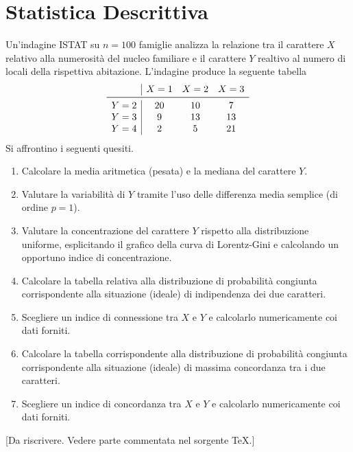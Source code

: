 
\section{Statistica Descrittiva}

\begin{esercizio}
  Un'indagine ISTAT su $n = 100$ famiglie analizza la relazione tra il
  carattere $X$ relativo alla numerosità del nucleo familiare e il
  carattere $Y$ realtivo al numero di locali della rispettiva
  abitazione. L'indagine produce la seguente tabella
  \[
    \begin{array}{c|ccc}
      & X = 1 & X = 2 & X = 3 \\
      \midrule
      Y = 2 & 20    & 10    & 7     \\
      Y = 3 & 9     & 13    & 13    \\
      Y = 4 & 2     & 5     & 21
    \end{array}
  \]
  Si affrontino i seguenti quesiti.
  \begin{enumerate}[leftmargin=*]
  \item Calcolare la media aritmetica (pesata) e la mediana del
    carattere $Y$.
  \item Valutare la variabilità di $Y$ tramite l'uso delle differenza
    media semplice (di ordine $p = 1$).
  \item Valutare la concentrazione del carattere $Y$ rispetto alla
    distribuzione uniforme, esplicitando il grafico della curva di
    Lorentz-Gini e calcolando un opportuno indice di concentrazione.
  \item Calcolare la tabella relativa alla distribuzione di
    probabilità congiunta corrispondente alla situazione (ideale) di
    indipendenza dei due caratteri.
  \item Scegliere un indice di connessione tra $X$ e $Y$ e calcolarlo
    numericamente coi dati forniti.
  \item Calcolare la tabella corrispondente alla distribuzione di
    probabilità congiunta corrispondente alla situazione (ideale) di
    massima concordanza tra i due caratteri.
  \item Scegliere un indice di concordanza tra $X$ e $Y$ e calcolarlo
    numericamente coi dati forniti.
  \end{enumerate}
\end{esercizio}

\begin{soluzione}
  {\color{red} [Da riscrivere. Vedere parte commentata
    nel sorgente \TeX{}.]}
\end{soluzione}

